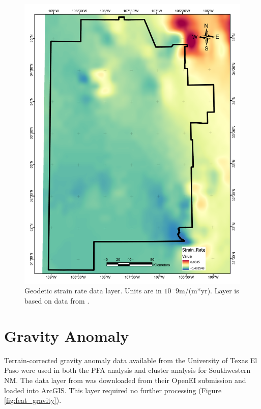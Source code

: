\begin{figure}[H]
\centering
\includegraphics[width=0.75\linewidth]{templates/images/Figure-StrainRate.pdf}
\caption[Geodetic strain rate data layer]{Geodetic strain rate data layer. Units are in $10^-9$m/(m*yr). Layer is based on data from \protect\citet{kreemer_geodetic_2014}.}
\label{fig:feat_strain}
\end{figure}
\pagebreak

\section{Gravity Anomaly}\label{app:dl_grav_anomaly}
Terrain-corrected gravity anomaly data available from the University of Texas El Paso \citep{utep_gravity_2011} were used in both the PFA analysis \citep{bielicki_hydrogeolgic_2015} and cluster analysis \citep{pepin_new_2019} for Southwestern NM. The data layer from \citet{bielicki_hydrogeolgic_2015} was downloaded from their OpenEI submission \citep{kelley_geothermal_2015} and loaded into ArcGIS. This layer required no further processing (Figure \ref{fig:feat_gravity}).

